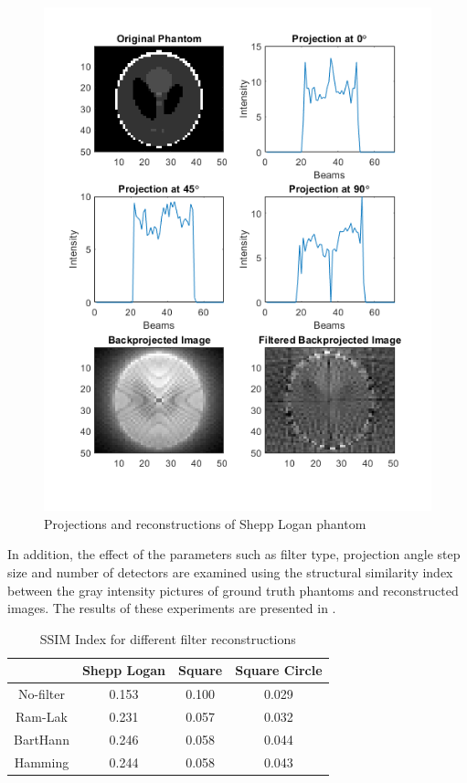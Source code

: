 \documentclass[journal]{IEEEtran}
\begin{document}
\begin{figure}[h]
	\centering
	\includegraphics[width=\columnwidth,height=.3\textheight]{images/shepp_projected.png}
	\caption{Projections and reconstructions of Shepp Logan phantom}\label{fig:sheppprojected}
\end{figure}
\newpage
In addition, the effect of the parameters such as filter type, projection angle step size and number of detectors are examined using the structural similarity index \cite{wang2004image} between the gray intensity pictures of ground truth phantoms and reconstructed images. The results of these experiments are presented in .
\begin{table}[h]
\centering
	\begin{tabular}{|c|c|c|c|}
		\hline 
		\diagbox{Filters}{Phantoms} & Shepp Logan & Square & Square Circle \\ 
		\hline 
		No-filter & 0.153 & 0.100 & 0.029 \\ 
		Ram-Lak & 0.231 & 0.057 & 0.032 \\ 
		BartHann & 0.246 & 0.058 & 0.044 \\ 
		Hamming & 0.244 & 0.058 & 0.043 \\ 
		\hline 
		\end{tabular}
\caption{\label{tab:filter}SSIM Index for different filter reconstructions}
\end{table}
\end{document}
